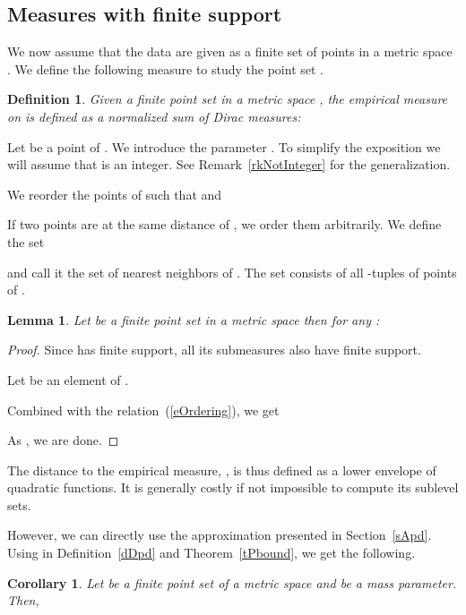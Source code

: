 \documentclass[a4paper]{article}
\newtheorem{definition}[theorem]{Definition}
\newtheorem{lemma}[theorem]{Lemma}
\newtheorem{corollary}[theorem]{Corollary}
\begin{document}
\subsection{Measures with finite support}\label{sRestrict}

We now assume that the data are given as a finite set of points  in a metric space .
We define the following measure to study the point set .

\begin{definition}
Given a finite point set  in a metric space , the \emph{empirical measure}  on  is defined as a normalized sum of Dirac measures:

\end{definition}

Let  be a point of . 
We introduce the parameter .
To simplify the exposition we will assume that  is an integer.
See Remark~\ref{rkNotInteger} for the generalization.

We reorder the points of  such that  and 

If two points are at the same distance of , we order them arbitrarily.
We define the set 

and call it the set of  nearest neighbors of .
The set  consists of all -tuples of points of .

\begin{lemma}\label{Ewriting}
Let  be a finite point set in a metric space  then for any :

\end{lemma}

\begin{proof}
Since  has finite support, all its submeasures also have finite support.

Let  be an element of .

Combined with the relation~(\ref{eOrdering}), we get

As , we are done.
\end{proof}

The distance to the empirical measure, , is thus defined as a lower envelope of quadratic functions.
It is generally costly if not impossible to compute its sublevel sets.

However, we can directly use the approximation presented in Section~\ref{sApd}.
Using  in Definition~\ref{dDpd} and Theorem~\ref{tPbound}, we get the following.

\begin{corollary}\label{cPbound}
Let  be a finite point set of a metric space  and  be a mass parameter.
Then,

\end{corollary}
\end{document}
